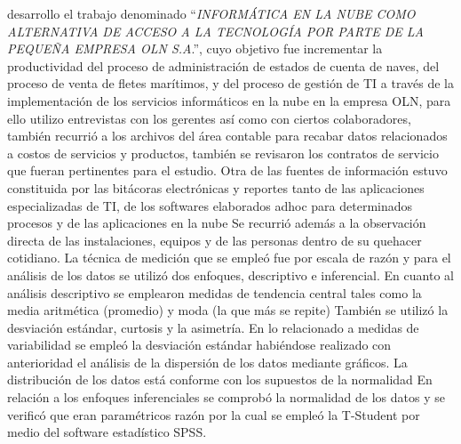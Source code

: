\cite{jcampos} desarrollo el trabajo denominado ``\emph{INFORMÁTICA EN LA NUBE
COMO ALTERNATIVA DE ACCESO A LA TECNOLOGÍA POR PARTE DE LA PEQUEÑA EMPRESA
OLN S.A}.'', cuyo objetivo fue incrementar la productividad del proceso de
administración de estados de cuenta de naves, del proceso de venta de fletes
marítimos, y del proceso de gestión de TI a través de la implementación
de los servicios informáticos en la nube en la empresa OLN, para ello utilizo
entrevistas con los gerentes así como con ciertos colaboradores, también recurrió
a los archivos del área contable para recabar datos relacionados a costos de
servicios y productos, también se revisaron los contratos de servicio que fueran
pertinentes para el estudio. Otra de las fuentes de información estuvo constituida
por las bitácoras electrónicas y reportes tanto de las aplicaciones especializadas de
TI, de los softwares elaborados adhoc para determinados procesos y de las aplicaciones en la nube
Se recurrió además a la observación directa de las instalaciones, equipos y de las personas
dentro de su quehacer cotidiano. La técnica de medición que se empleó fue por escala de
razón y para el análisis de los datos se utilizó dos enfoques, descriptivo e inferencial.
En cuanto al análisis descriptivo se emplearon medidas de tendencia central tales como
la media aritmética (promedio) y moda (la que más se repite) También se utilizó la
desviación estándar, curtosis y la asimetría.
En lo relacionado a medidas de variabilidad se empleó la desviación estándar habiéndose
realizado con anterioridad el análisis de la dispersión de los datos mediante gráficos.
La distribución de los datos está conforme con los supuestos de la normalidad
En relación a los enfoques inferenciales se comprobó la normalidad de los datos y se
verificó que eran paramétricos razón por la cual se empleó la T-Student por medio del
software estadístico SPSS.

